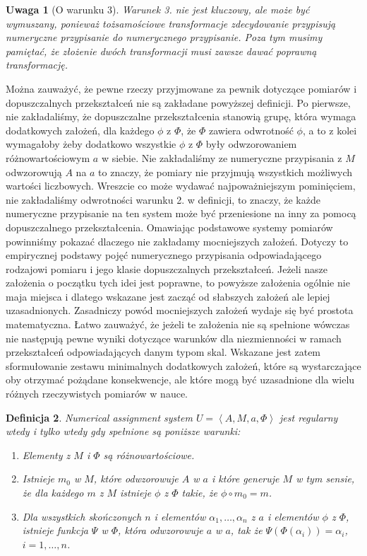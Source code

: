 \documentclass[12pt,a4paper]{report}
\newtheorem{definition}{Definicja}[chapter]
\newtheorem{remark}[definition]{Uwaga}
\newcommand{\tuple}[1]{\left\langle {#1} \right\rangle}
\begin{document}
\begin{remark}[O warunku 3]
Warunek 3. nie jest kluczowy, ale może być wymuszany, ponieważ tożsamościowe transformacje zdecydowanie przypisują numeryczne przypisanie do numerycznego przypisanie. Poza tym musimy pamiętać, że złożenie dwóch transformacji musi zawsze dawać poprawną transformację.
\end{remark}

  Można zauważyć, że pewne rzeczy przyjmowane za pewnik dotyczące pomiarów i dopuszczalnych przekształceń nie są zakładane  powyższej definicji. Po pierwsze, nie zakładaliśmy, że dopuszczalne przekształcenia stanowią grupę, która wymaga dodatkowych założeń, dla każdego $\phi$ z $\Phi$, że $\Phi$ zawiera odwrotność $\phi$, a to z kolei wymagałoby żeby dodatkowo wszystkie $\phi$ z $\Phi$ były odwzorowaniem różnowartościowym $a$ w siebie. Nie zakładaliśmy ze numeryczne przypisania z $M$ odwzorowują $A$ na $a$ to znaczy, że pomiary nie przyjmują wszystkich  możliwych wartości liczbowych. Wreszcie co może wydawać najpoważniejszym pominięciem, nie zakładaliśmy odwrotności warunku 2. w definicji, to znaczy, że każde numeryczne przypisanie na ten system może być przeniesione na inny za pomocą dopuszczalnego przekształcenia. Omawiając podstawowe systemy pomiarów powinniśmy pokazać dlaczego nie zakładamy mocniejszych założeń. Dotyczy to empirycznej podstawy pojęć numerycznego przypisania odpowiadającego rodzajowi pomiaru i jego klasie dopuszczalnych przekształceń. Jeżeli nasze założenia o początku tych idei jest poprawne, to powyższe założenia ogólnie nie maja miejsca i dlatego wskazane jest zacząć od słabszych założeń ale lepiej uzasadnionych. Zasadniczy powód mocniejszych założeń wydaje się być prostota matematyczna. Łatwo zauważyć, że jeżeli te założenia nie są spełnione 
wówczas nie następują pewne wyniki dotyczące warunków dla niezmienności w ramach przekształceń odpowiadających danym typom skal. Wskazane jest zatem sformułowanie zestawu minimalnych dodatkowych założeń, które są wystarczające oby otrzymać pożądane konsekwencje, ale które mogą być uzasadnione dla wielu różnych rzeczywistych pomiarów w nauce.
\begin{definition}
Numerical assignment system $U=\tuple{A, M, a, \Phi}$ jest regularny wtedy i tylko wtedy gdy spełnione są poniższe warunki:
\begin{enumerate}
\item
Elementy z $M$ i $\Phi$ są różnowartościowe.
\item
Istnieje $m_{0}$ w $M$, które odwzorowuje $A$ w $a$ i które generuje $M$ w tym sensie, że dla każdego $m$ z $M$ istnieje $\phi$ z $\Phi$ takie, że $\phi \circ m_{0}=m$.
\item
Dla wszystkich skończonych $n$ i elementów $\alpha_{1},\dots,\alpha_{n}$ z $a$ i elementów $\phi$ z $\Phi$, istnieje funkcja $\Psi$ w $\Phi$, która odwzorowuje $a$ w $a$, tak że $\Psi(\Phi(\alpha_{i}))=\alpha_{i}$, $i=1,\ldots,n$.
\end{enumerate}
\end{definition}
\end{document}
